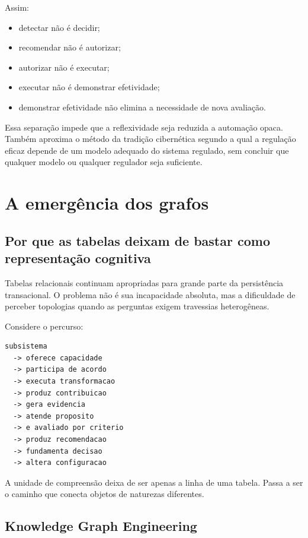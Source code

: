 \documentclass[11pt,a4paper,oneside]{article}
\begin{document}
Assim:

\begin{itemize}
  \item detectar não é decidir;
  \item recomendar não é autorizar;
  \item autorizar não é executar;
  \item executar não é demonstrar efetividade;
  \item demonstrar efetividade não elimina a necessidade de nova avaliação.
\end{itemize}

Essa separação impede que a reflexividade seja reduzida a automação opaca. Também aproxima o método da tradição cibernética segundo a qual a regulação eficaz depende de um modelo adequado do sistema regulado, sem concluir que qualquer modelo ou qualquer regulador seja suficiente.

\section{A emergência dos grafos}

\subsection{Por que as tabelas deixam de bastar como representação cognitiva}

Tabelas relacionais continuam apropriadas para grande parte da persistência transacional. O problema não é sua incapacidade absoluta, mas a dificuldade de perceber topologias quando as perguntas exigem travessias heterogêneas.

Considere o percurso:

\begin{lstlisting}
subsistema
  -> oferece capacidade
  -> participa de acordo
  -> executa transformacao
  -> produz contribuicao
  -> gera evidencia
  -> atende proposito
  -> e avaliado por criterio
  -> produz recomendacao
  -> fundamenta decisao
  -> altera configuracao
\end{lstlisting}

A unidade de compreensão deixa de ser apenas a linha de uma tabela. Passa a ser o caminho que conecta objetos de naturezas diferentes.

\subsection{Knowledge Graph Engineering}
\end{document}
